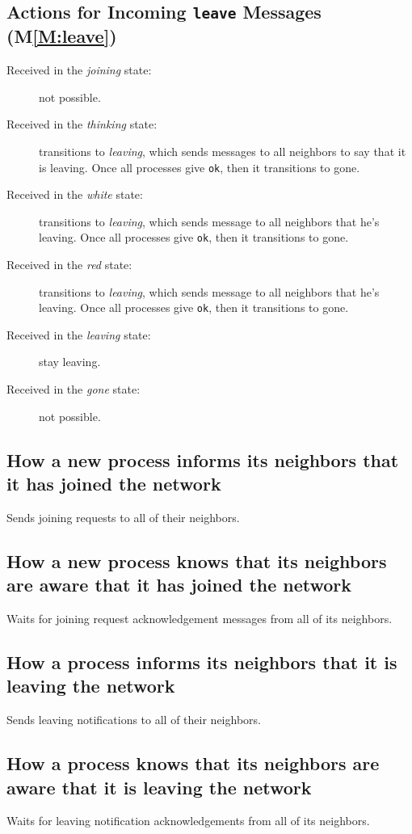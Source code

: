 \documentclass[11pt]{article}
\begin{document}
\subsection{Actions for Incoming \texttt{leave} Messages (M\ref{M:leave})}
\begin{description}
\item[Received in the \textit{joining} state:] not possible.
\item[Received in the \textit{thinking} state:] transitions to \emph{leaving}, which sends messages to all neighbors to say that it is leaving. Once all processes give \texttt{ok}, then it transitions to gone.
\item[Received in the \textit{white} state:] transitions to \emph{leaving}, which sends message to all neighbors that he's leaving. Once all processes give \texttt{ok}, then it transitions to gone.
\item[Received in the \textit{red} state:] transitions to \emph{leaving}, which sends message to all neighbors that he's leaving. Once all processes give \texttt{ok}, then it transitions to gone.
\item[Received in the \textit{leaving} state:] stay leaving.
\item[Received in the \textit{gone} state:] not possible.
\end{description}


\subsection{How a new process informs its neighbors that it has joined the network}
Sends joining requests to all of their neighbors.

\subsection{How a new process knows that its neighbors are aware that it has joined the network}
Waits for joining request acknowledgement messages from all of its neighbors.
\subsection{How a process informs its neighbors that it is leaving the network}
Sends leaving notifications to all of their neighbors.

\subsection{How a process knows that its neighbors are aware that it is leaving the network}
Waits for leaving notification acknowledgements from all of its neighbors.
\end{document}
